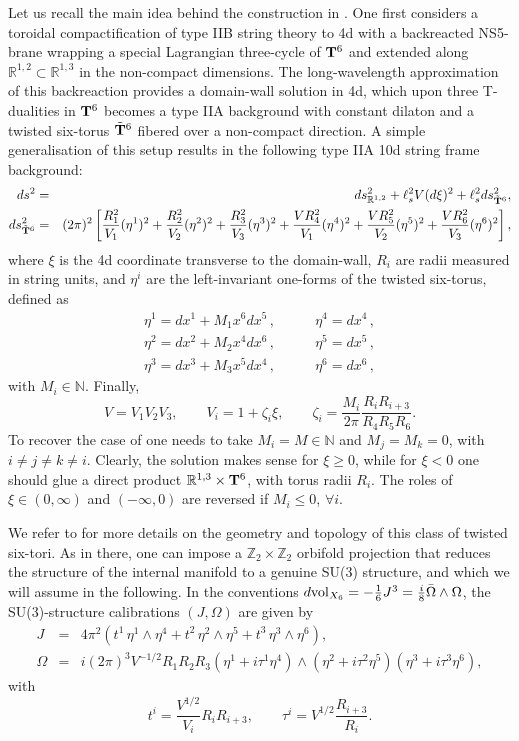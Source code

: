 \documentclass[11pt]{article}
\def\be{\begin{equation}}
\def\ee{\end{equation}}
\def\bea{\begin{eqnarray}}
\def\eea{\end{eqnarray}}
\def\Om{\Omega}
\newcommand{\IR}{\mathbb{R}}
\newcommand{\IZ}{\mathbb{Z}}
\begin{document}
Let us recall the main idea behind the construction in \cite{Gurrieri:2002wz}. One first considers a toroidal compactification of type IIB string theory to 4d with a backreacted NS5-brane wrapping a special Lagrangian three-cycle of ${\bf T}^6$ and extended along $\IR^{1,2} \subset \IR^{1,3}$ in the non-compact dimensions. The long-wavelength approximation  of this backreaction provides a domain-wall solution in 4d, which upon three T-dualities in ${\bf T}^6$ becomes a type IIA background with constant dilaton and a twisted six-torus $\tilde{\bf T}^6$ fibered over a non-compact direction. A simple generalisation of this setup results in the following type IIA 10d string frame background:
\bea
\label{SU3ex}
ds^2 &= &ds^2_{\IR^{1,2}}+ \ell_s^2 V(d\xi)^2 + \ell_s^2 ds^2_{\tilde{\bf T}^6} , \\ 
ds^2_{\tilde{\bf T}^6}& = &(2\pi)^2 \left[\frac{R_1^2}{V_1}(\eta^1)^2+\frac{R_2^2}{V_2}(\eta^2)^2+\frac{R_3^2}{V_3}(\eta^3)^2+\frac{V R_4^2}{V_1}(\eta^4)^2+\frac{V R_5^2}{V_2}(\eta^5)^2+\frac{V R_6^2}{V_3}(\eta^6)^2 \right] ,
\label{SU3exb}
\eea
where $\xi$ is the 4d coordinate transverse to the domain-wall, $R_i$ are radii measured in string units, and $\eta^i$ are the left-invariant one-forms of the twisted six-torus, defined as
\begin{equation}
\begin{array}{ll}
\eta^1= d x^1 + M_1  x^6 d x^5   \,, & \qquad \eta^4= d x^4 \,, \\
\eta^2= dx^2 + M_2 x^4 d x^6  \,, & \qquad \eta^5= d x^5 \,, \\
\eta^3= d x^3 + M_3 x^5 d x^4   \,, & \qquad \eta^6=  d x^6 \, ,
\end{array}
\label{etas}
\end{equation}
with $M_i \in \mathbb{N}$. Finally, 
\be
V = V_1V_2V_3 , \qquad V_i = 1 + \zeta_i \xi , \qquad \zeta_i = \frac{M_i}{2\pi} \frac{R_i R_{i+3}}{R_4R_5R_6} .
\label{Vis}
\ee
To recover the case of \cite{Gurrieri:2002wz} one needs to take $M_i=M \in \mathbb{N}$ and $M_j= M_k=0$, with $i \neq j \neq k \neq i$. Clearly, the solution makes sense for $\xi \geq 0$, while for $\xi<0$ one should glue a direct product $\IR^{1,3} \times {\bf T}^6$, with torus radii $R_i$. The roles of  $\xi \in (0,\infty)$ and $(-\infty, 0)$ are reversed if $M_i \leq 0$, $\forall i$.  

We refer to \cite{Marchesano:2006ns} for more details on the geometry and topology of this class of twisted six-tori. As in there, one can impose a $\IZ_2 \times \IZ_2$ orbifold projection that reduces the structure of the internal manifold to a genuine SU(3) structure, and which we will assume in the following. In the conventions $d{\rm vol}_{X_6} = -\frac{1}{6} J^3 = \frac{i}{8} \bar{\Omega} \wedge \Omega$, the SU(3)-structure calibrations $(J,\Omega)$ are given by
\bea
\label{Jex}
J & = & 4\pi^2 \left( t^1 \,\eta^1 \wedge \eta^4 +t^2\, \eta^2 \wedge \eta^5  + t^3 \,\eta^3 \wedge \eta^6 \right) , \\
\Om & = & {i} (2\pi)^3 V^{-1/2} R_1R_2R_3 \left( \eta^1 + i  \tau^1 \eta^4 \right) \wedge \left( \eta^2 + i \tau^2 \eta^5 \right) \left( \eta^3 + i \tau^3 \eta^6 \right) ,
\label{Omex}
\eea
with
\be
\label{defttau}
t^i = \frac{V^{1/2}}{V_i} R_iR_{i+3} , \qquad  \tau^i = V^{1/2} \frac{R_{i+3}}{R_i} .
\ee
\end{document}

